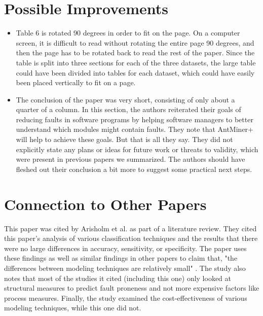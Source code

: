 \documentclass[english]{article}
\begin{document}
\section*{Possible Improvements}
\begin{itemize}
\item Table 6 \cite[p. 835]{Vandecruys08} is rotated 90 degrees in order to fit on the page. On a computer screen, it is difficult to read without rotating the entire page 90 degrees, and then the page has to be rotated back to read the rest of the paper. Since the table is split into three sections for each of the three datasets, the large table could have been divided into tables for each dataset, which could have easily been placed vertically to fit on a page.
\item The conclusion of the paper was very short, consisting of only about a quarter of a column. In this section, the authors reiterated their goals of reducing faults in software programs by helping software managers to better understand which modules might contain faults. They note that AntMiner+ will help to achieve these goals. But that is all they say. They did not explicitly state any plans or ideas for future work or threats to validity, which were present in previous papers we summarized. The authors should have fleshed out their conclusion a bit more to suggest some practical next steps.
\end{itemize}

\section*{Connection to Other Papers}
This paper was cited by Arisholm et al. \cite{arisholm10} as part of a literature review. They cited this paper's analysis of various classification techniques and the results that there were no large differences in accuracy, sensitivity, or specificity. The paper uses these findings as well as similar findings in other papers to claim that, "the differences between modeling techniques are relatively small" \cite[p. 4]{arisholm10}. The study also notes that most of the studies it cited (including this one) only looked at structural measures to predict fault proneness and not more expensive factors like process measures. Finally, the study examined the cost-effectiveness of various modeling techniques, while this one did not.




\end{document}
